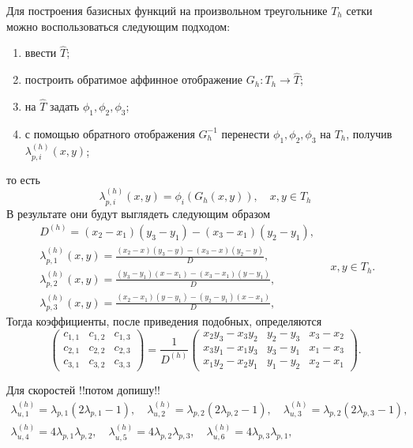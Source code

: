 \documentclass[a4paper,14pt]{extarticle}
\begin{document}
	Для построения базисных функций на произвольном
	треугольнике $T_h$ сетки можно воспользоваться
	следующим подходом:
	\begin{enumerate}
		\item ввести  $\widehat T$;
		
		\item построить обратимое аффинное
		отображение
		$G_h:T_h\to\widehat T$;
		
		\item на $\widehat T$ задать $\phi_1,\phi_2,\phi_3$;
		
		\item с помощью обратного отображения
		$G_h^{-1}$ перенести $\phi_1,\phi_2,\phi_3$
		на  $T_h$,
		получив 
		$\lambda_{p,i}^{(h)}(x,y)$;
	\end{enumerate}
	то есть
	\begin{equation}
		\lambda^{(h)}_{p,i}(x,y) = \phi_i(G_h(x,y)),\quad x,y \in T_h
	\end{equation}
	В результате они будут выглядеть следующим образом
	\begin{equation}
	\begin{gathered}
	D^{(h)} = (x_2 - x_1)(y_3 - y_1) - (x_3 - x_1)(y_2 - y_1),
	\\
	\lambda_{p,1}^{(h)}(x,y) =
	\frac{(x_2 - x)(y_3 - y) - (x_3 - x)(y_2 - y)}{D},
	\\
	\lambda_{p,2}^{(h)}(x,y) =
	\frac{(y_3 - y_1)(x - x_1) - (x_3 - x_1)(y - y_1)}{D},
	\\
	\lambda_{p,3}^{(h)}(x,y) =
	\frac{(x_2 - x_1)(y - y_1) - (y_2 - y_1)(x - x_1)}{D},
	\end{gathered}
	\quad x,y \in T_h.
	\end{equation}
	Тогда коэффициенты, после приведения подобных, определяются
	\begin{equation}
		\begin{pmatrix}
			c_{1,1} & c_{1,2} & c_{1,3}\\
			c_{2,1} & c_{2,2} & c_{2,3}\\
			c_{3,1} & c_{3,2} & c_{3,3}
		\end{pmatrix}
		=
		\frac{1}{D^{(h)}}
		\begin{pmatrix}
			x_2y_3-x_3y_2 & y_2-y_3 & x_3-x_2\\
			x_3y_1-x_1y_3 & y_3-y_1 & x_1-x_3\\
			x_1y_2-x_2y_1 & y_1-y_2 & x_2-x_1
		\end{pmatrix}.
	\end{equation}
	
	
	Для скоростей !!потом допишу!!
	\begin{equation}
		\begin{gathered}
			\lambda_{u,1}^{(h)}=\lambda_{p,1}(2\lambda_{p,1}-1),\quad
			\lambda_{u,2}^{(h)}=\lambda_{p,2}(2\lambda_{p,2}-1),\quad
			\lambda_{u,3}^{(h)}=\lambda_{p,2}(2\lambda_{p,3}-1), \\
			\lambda_{u,4}^{(h)}=4\lambda_{p,1}\lambda_{p,2}, \quad
			\lambda_{u,5}^{(h)}=4\lambda_{p,2}\lambda_{p,3},\quad
			\lambda_{u,6}^{(h)}=4\lambda_{p,3}\lambda_{p,1}, \\
		\end{gathered}
	\end{equation}
\end{document}
